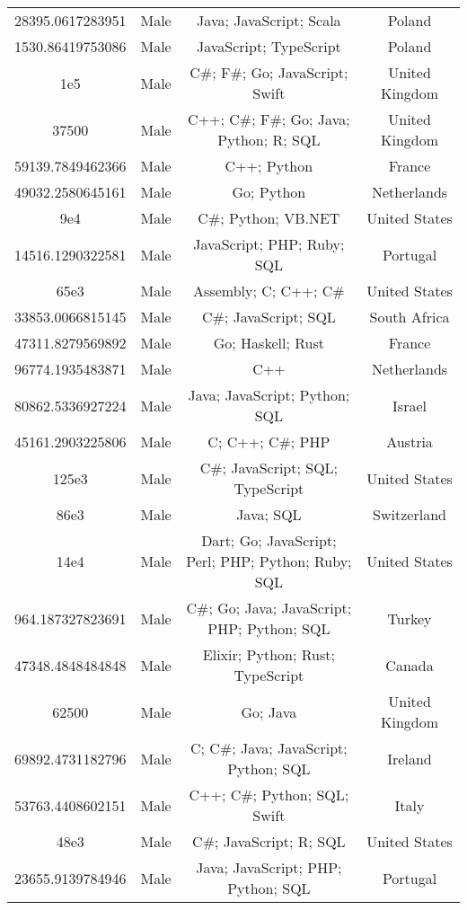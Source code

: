 \begin{center}
\begin{tabular}{ |c|c|c|c| }
28395.0617283951  &  Male  &  Java; JavaScript; Scala  &  Poland  \\ 
1530.86419753086  &  Male  &  JavaScript; TypeScript  &  Poland  \\ 
1e5  &  Male  &  C\#; F\#; Go; JavaScript; Swift  &  United Kingdom  \\ 
37500  &  Male  &  C++; C\#; F\#; Go; Java; Python; R; SQL  &  United Kingdom  \\ 
59139.7849462366  &  Male  &  C++; Python  &  France  \\ 
49032.2580645161  &  Male  &  Go; Python  &  Netherlands  \\ 
9e4  &  Male  &  C\#; Python; VB.NET  &  United States  \\ 
14516.1290322581  &  Male  &  JavaScript; PHP; Ruby; SQL  &  Portugal  \\ 
65e3  &  Male  &  Assembly; C; C++; C\#  &  United States  \\ 
33853.0066815145  &  Male  &  C\#; JavaScript; SQL  &  South Africa  \\ 
47311.8279569892  &  Male  &  Go; Haskell; Rust  &  France  \\ 
96774.1935483871  &  Male  &  C++  &  Netherlands  \\ 
80862.5336927224  &  Male  &  Java; JavaScript; Python; SQL  &  Israel  \\ 
45161.2903225806  &  Male  &  C; C++; C\#; PHP  &  Austria  \\ 
125e3  &  Male  &  C\#; JavaScript; SQL; TypeScript  &  United States  \\ 
86e3  &  Male  &  Java; SQL  &  Switzerland  \\ 
14e4  &  Male  &  Dart; Go; JavaScript; Perl; PHP; Python; Ruby; SQL  &  United States  \\ 
964.187327823691  &  Male  &  C\#; Go; Java; JavaScript; PHP; Python; SQL  &  Turkey  \\ 
47348.4848484848  &  Male  &  Elixir; Python; Rust; TypeScript  &  Canada  \\ 
62500  &  Male  &  Go; Java  &  United Kingdom  \\ 
69892.4731182796  &  Male  &  C; C\#; Java; JavaScript; Python; SQL  &  Ireland  \\ 
53763.4408602151  &  Male  &  C++; C\#; Python; SQL; Swift  &  Italy  \\ 
48e3  &  Male  &  C\#; JavaScript; R; SQL  &  United States  \\ 
23655.9139784946  &  Male  &  Java; JavaScript; PHP; Python; SQL  &  Portugal  \\ 

\end{tabular}
\end{center}
